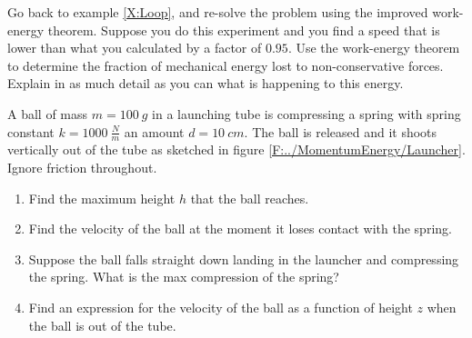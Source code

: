 \begin{exercise}
Go back to example \ref{X:Loop}, and re-solve the problem using the improved work-energy theorem. Suppose you do this experiment and you find a speed that is lower than what you calculated by a factor of $0.95$. 
Use the work-energy theorem to determine the fraction of mechanical energy lost to non-conservative forces. 
Explain in as much detail as you can what is happening to this energy. 
\end{exercise}



\begin{example}
\label{X:launcher}
A ball of mass $m = 100\ g$ in a launching tube is compressing a spring with spring constant $k=1000\ \frac Nm$ an amount $d=10\ cm$. The ball is released and it shoots vertically out of the tube as sketched in figure \ref{F:../MomentumEnergy/Launcher}. Ignore friction throughout.
\begin{enumerate} 
\item Find the maximum height $h$ that the ball reaches.
\item Find the velocity of the ball at the moment it loses contact with the spring. 
\item Suppose the ball falls straight down landing in the launcher and compressing the spring. What is the max compression of the spring?
\item Find an expression for the velocity of the ball as a function of height $z$ when the ball is out of the tube. 
\end{enumerate}
\end{example}



